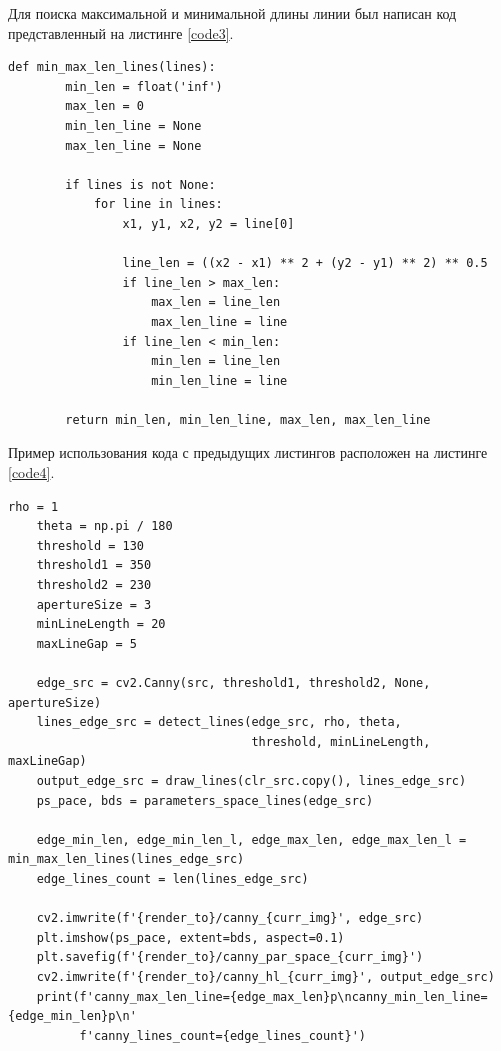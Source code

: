 \documentclass[a4paper, 16pt]{article}
\begin{document}
    \noindent Для поиска максимальной и минимальной длины линии был написан код представленный на листинге \ref{code3}.
    \begin{lstlisting}[label=code3, caption={Поиск максимальной и минимальной длины линии.}]
    def min_max_len_lines(lines):
        min_len = float('inf')
        max_len = 0
        min_len_line = None
        max_len_line = None

        if lines is not None:
            for line in lines:
                x1, y1, x2, y2 = line[0]

                line_len = ((x2 - x1) ** 2 + (y2 - y1) ** 2) ** 0.5
                if line_len > max_len:
                    max_len = line_len
                    max_len_line = line
                if line_len < min_len:
                    min_len = line_len
                    min_len_line = line

        return min_len, min_len_line, max_len, max_len_line
    \end{lstlisting}


    \noindent Пример использования кода с предыдущих листингов расположен на листинге \ref{code4}.
    \begin{lstlisting}[label=code4, caption={Пример использования программы для поиска линий и построения пространства параметров.}]
    rho = 1
    theta = np.pi / 180
    threshold = 130
    threshold1 = 350
    threshold2 = 230
    apertureSize = 3
    minLineLength = 20
    maxLineGap = 5

    edge_src = cv2.Canny(src, threshold1, threshold2, None, apertureSize)
    lines_edge_src = detect_lines(edge_src, rho, theta,
                                  threshold, minLineLength, maxLineGap)
    output_edge_src = draw_lines(clr_src.copy(), lines_edge_src)
    ps_pace, bds = parameters_space_lines(edge_src)

    edge_min_len, edge_min_len_l, edge_max_len, edge_max_len_l = min_max_len_lines(lines_edge_src)
    edge_lines_count = len(lines_edge_src)

    cv2.imwrite(f'{render_to}/canny_{curr_img}', edge_src)
    plt.imshow(ps_pace, extent=bds, aspect=0.1)
    plt.savefig(f'{render_to}/canny_par_space_{curr_img}')
    cv2.imwrite(f'{render_to}/canny_hl_{curr_img}', output_edge_src)
    print(f'canny_max_len_line={edge_max_len}p\ncanny_min_len_line={edge_min_len}p\n'
          f'canny_lines_count={edge_lines_count}')
    \end{lstlisting}
\end{document}
